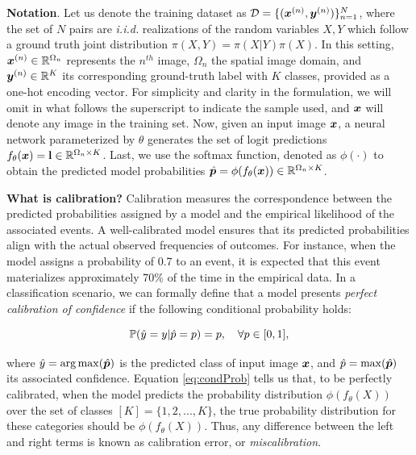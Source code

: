 \documentclass[twocolumn,final,10pt]{elsarticle}
\newcommand{\rev}[1]{{\color{black}#1}}
\begin{document}
\noindent \textbf{Notation}. 
Let us denote the training dataset as $\mathcal{D}=\{({\bm{x}}^{(n)}, {\bm{y}}^{(n)})\}_{n=1}^N$, \rev{where the set of $N$ pairs are \textit{i.i.d.} realizations of the random variables $X,Y$ which follow a ground truth joint distribution $\pi (X,Y)=\pi(X|Y)\pi(X).$ %
In this setting, ${\bm{x}}^{(n)} \in {\mathbb{R}}^{\Omega_n}$ represents the $n^{th}$ image, $\Omega_n$ the spatial image domain, and ${\bm{y}}^{(n)} \in {\mathbb{R}}^K$ its corresponding ground-truth label with $K$ classes, 
provided as a one-hot encoding vector. For simplicity and clarity in the formulation, we will omit in what follows the superscript to indicate the sample used, and ${\bm{x}}$ will denote any image in the training set. Now, given an input image ${\bm{x}}$, a neural network parameterized by $\theta$ generates the set of logit predictions $f_{\theta}({\bm{x}})={\mathbf{l}} \in {\mathbb{R}}^{\Omega_n \times K}$. Last, we use the softmax function, denoted as $\phi (\cdot)$ to obtain the predicted model probabilities $\hat{{\bm{p}}}=\phi(f_{\theta}({\bm{x}})) \in {\mathbb{R}}^{\Omega_n \times K}$.}

\rev{\noindent \textbf{What is calibration?} Calibration measures the correspondence between the predicted probabilities assigned by a model and the empirical likelihood of the associated events. A well-calibrated model ensures that its predicted probabilities align with the actual observed frequencies of outcomes. For instance, when the model assigns a probability of 0.7 to an event, it is expected that this event materializes approximately 70\% of the time in the empirical data. In a classification scenario, we can formally define that a model presents \textit{perfect calibration of confidence} if the following conditional probability holds:}

\begin{equation}
\label{eq:condProb}
\rev{\sP(\hat{y} = y| \hat{p} = p)= p, \quad \forall p \in [0,1],}
\end{equation}


\rev{\noindent where $\hat{y} = \arg \max (\hat{{\bm{p}}})$ is the predicted class of input image ${\bm{x}}$, and $\hat{p} = \max (\hat{{\bm{p}}})$ its associated confidence. Equation \ref{eq:condProb} tells us that, to be perfectly calibrated, when the model predicts the probability distribution $\phi(f_{\theta}(X))$ over the set of classes $[K]=\{1,2,...,K\}$, the true probability distribution for these categories should be $\phi(f_{\theta}(X))$. Thus, any difference between the left and right terms is known as calibration error, or \textit{miscalibration}.}
\end{document}
